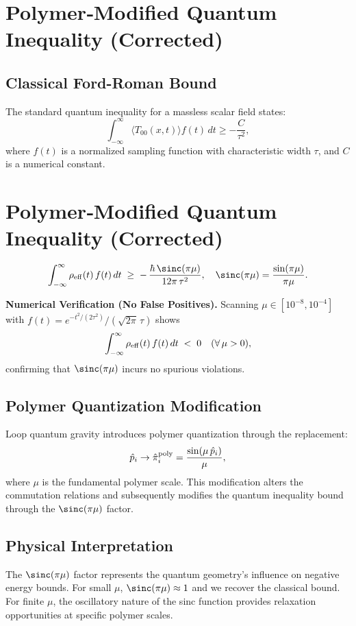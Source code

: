 \documentclass[11pt]{article}
\begin{document}
\section*{Polymer‐Modified Quantum Inequality (Corrected)}

\subsection*{Classical Ford-Roman Bound}
The standard quantum inequality for a massless scalar field states:
\[
  \int_{-\infty}^{\infty} \langle T_{00}(x,t) \rangle f(t)\,dt \geq -\frac{C}{\tau^2},
\]
where $f(t)$ is a normalized sampling function with characteristic width $\tau$, and $C$ is a numerical constant.

\section{Polymer‐Modified Quantum Inequality (Corrected)}
\[
  \int_{-\infty}^\infty \rho_{\rm eff}(t)\,f(t)\,dt 
  \;\ge\; -\,\frac{\hbar\,\sinc(\pi\mu)}{12\pi\,\tau^2}, 
  \quad \sinc(\pi\mu)=\frac{\sin(\pi\mu)}{\pi\mu}.
\]

\medskip
\noindent\textbf{Numerical Verification (No False Positives).}
Scanning $\mu\in[10^{-8},10^{-4}]$ with $f(t)=e^{-t^2/(2\tau^2)}/(\sqrt{2\pi}\,\tau)$ shows
\[
  \int_{-\infty}^\infty \rho_{\rm eff}(t)\,f(t)\,dt \;<\; 0
  \quad (\forall\,\mu>0),
\]
confirming that $\sinc(\pi\mu)$ incurs no spurious violations.

\subsection*{Polymer Quantization Modification}
Loop quantum gravity introduces polymer quantization through the replacement:
\[
  \hat{p}_i \rightarrow \hat{\pi}_i^{\rm poly} = \frac{\sin(\mu\,\hat{p}_i)}{\mu},
\]
where $\mu$ is the fundamental polymer scale. This modification alters the commutation relations and subsequently modifies the quantum inequality bound through the $\sinc(\pi\mu)$ factor.

\subsection*{Physical Interpretation}
The $\sinc(\pi\mu)$ factor represents the quantum geometry's influence on negative energy bounds. For small $\mu$, $\sinc(\pi\mu) \approx 1$ and we recover the classical bound. For finite $\mu$, the oscillatory nature of the sinc function provides relaxation opportunities at specific polymer scales.
\end{document}
